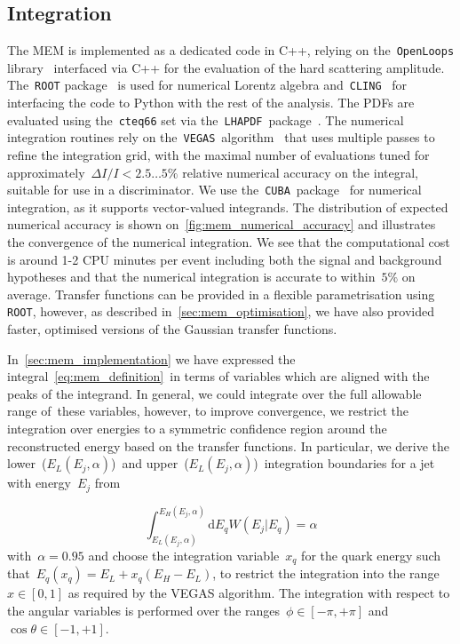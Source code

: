 \subsection{Integration}
\label{sec:mem_integration}

The MEM is implemented as a dedicated code in C++, relying on the~\texttt{OpenLoops} library~\cite{Cascioli:2011va} interfaced via C++ for the evaluation of the hard scattering amplitude. The~\texttt{ROOT} package~\cite{Brun:1997pa} is used for numerical Lorentz algebra and~\texttt{CLING}~\cite{Vasilev:2012ev} for interfacing the code to Python with the rest of the analysis. The PDFs are evaluated using the~\texttt{cteq66} set via the~\texttt{LHAPDF}~package~\cite{Buckley:2014ana}. The numerical integration routines rely on the~\texttt{VEGAS}~algorithm~\cite{Lepage:1977sw} that uses multiple passes to refine the integration grid, with the maximal number of evaluations tuned for approximately~$\Delta I / I < 2.5 \dots 5\%$ relative numerical accuracy on the integral, suitable for use in a discriminator. We use the~\texttt{CUBA}~package~\cite{Hahn:2004fe} for numerical integration, as it supports vector-valued integrands. The distribution of expected numerical accuracy is shown on~\cref{fig:mem_numerical_accuracy} and illustrates the convergence of the numerical integration. We see that the computational cost is around 1-2 CPU minutes per event including both the signal and background hypotheses and that the numerical integration is accurate to within~$5\%$ on average. Transfer functions can be provided in a flexible parametrisation using \texttt{ROOT}, however, as described in~\cref{sec:mem_optimisation}, we have also provided faster, optimised versions of the Gaussian transfer functions.

In~\cref{sec:mem_implementation} we have expressed the integral~\cref{eq:mem_definition}~in terms of variables which are aligned with the peaks of the integrand. In general, we could integrate over the full allowable range of these variables, however, to improve convergence, we restrict the integration over energies to a symmetric confidence region around the reconstructed energy based on the transfer functions. In particular, we derive the lower~($E_L(E_j,\alpha)$)~and upper~($E_L(E_j,\alpha)$)~integration boundaries for a jet with energy~$E_j$ from

\begin{equation}
\int_{E_L(E_j,\alpha)}^{E_H(E_j,\alpha)} \mathrm{d}E_q W(E_j | E_q) = \alpha
\end{equation}
with~$\alpha = 0.95$ and choose the integration variable~$x_q$ for the quark energy such that~$E_q(x_q) = E_L + x_q (E_H - E_L)$, to restrict the integration into the range~$x\in[0,1]$ as required by the VEGAS algorithm. The integration with respect to the angular variables is performed over the ranges~$\phi \in [-\pi, +\pi]$ and~$\cos{\theta} \in [-1, +1]$.

